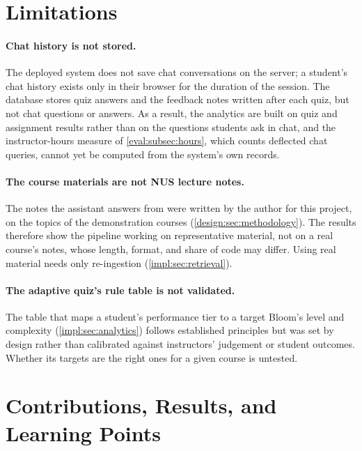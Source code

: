 \section{Limitations}
\label{concl:sec:limitations}

\paragraph{Chat history is not stored.} The deployed system does not save
chat conversations on the server; a student's chat history exists only in
their browser for the duration of the session. The database stores quiz
answers and the feedback notes written after each quiz, but not chat
questions or answers. As a result, the analytics are built on quiz and
assignment results rather than on the questions students ask in chat, and the instructor-hours measure of
\autoref{eval:subsec:hours}, which counts deflected chat queries, cannot yet
be computed from the system's own records.

\paragraph{The course materials are not NUS lecture notes.} The notes the
assistant answers from were written by the author for this project, on the
topics of the demonstration courses (\autoref{design:sec:methodology}). The
results therefore show the pipeline working on representative material, not
on a real course's notes, whose length, format, and share of code may
differ. Using real material needs only re-ingestion
(\autoref{impl:sec:retrieval}).

\paragraph{The adaptive quiz's rule table is not validated.} The table that
maps a student's performance tier to a target Bloom's level and complexity
(\autoref{impl:sec:analytics}) follows established principles but was set by
design rather than calibrated against instructors' judgement or student
outcomes. Whether its targets are the right ones for a given course is
untested.

\section{Contributions, Results, and Learning Points}
\label{concl:sec:reflection}

